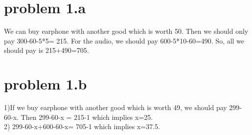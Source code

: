 \documentclass[12pt]{iopart}
\begin{document}
	\newcommand{\mL}{\mathscr{L}}
	\newcommand{\cT}{{\cal T}}
	\newcommand{\cM}{{\cal M}}
	\newcommand{\cE}{{\cal E}}
	\newcommand{\cL}{{\cal L}}
	\newcommand{\cF}{{\cal F}}
	\newcommand{\cB}{{\cal B}}
	\newcommand{\PML}{{\rm PML}}
	\newcommand{\FEM}{{\rm FEM}}
	\newcommand{\rd}{\,\mathrm{d}}
	
	\renewcommand{\i}{\mathbf{i}}
	\renewcommand{\v}{\mathbf{v}}
	\renewcommand{\u}{\mathbf{u}}

	\newcommand{\U}{\mathbf{U}}
	\newcommand{\w}{\mathbf{w}}
	\newcommand{\q}{\mathbf{q}}
	\newcommand{\W}{\mathbf{W}}
	\newcommand{\Q}{\mathbf{Q}}



\newcommand{\A}{{\mathbb{A}}}
	\renewcommand{\r}{\mathbf{r}}
	\newcommand{\R}{{\mathbb{R}}}
	\newcommand{\Z}{{\mathbb{Z}}}
	\newcommand{\C}{{\mathbb{C}}}
	\newcommand{\I}{{\mathbb{I}}}
	\renewcommand{\Re}{\mathrm{Re}\,}
	\renewcommand{\Im}{\mathrm{Im}\,}
	\renewcommand{\div}{\mathrm{div}}
	\newcommand{\curl}{\mathrm{curl}}
	\newcommand{\Curl}{\mathbf{curl}}
	
	\newcommand{\Np}{\mathcal{N}_p}
	\newcommand{\Ns}{\mathcal{N}_s}
	\newcommand{\Tp}{\mathcal{T}_p}
	\newcommand{\Ts}{\mathcal{T}_s}
	
	\newcommand{\be}{\begin{eqnarray}}
		\newcommand{\ee}{\end{eqnarray}}
	\newcommand{\ben}{\begin{eqnarray*}}
		\newcommand{\een}{\end{eqnarray*}}
	\newcommand{\nn}{\nonumber}

\section{problem 1.a}



We can buy earphone with another good which is worth 50. Then we should only pay  300-60-5*5= 215. For the audio, we should pay 600-5*10-60=490. So, all we should pay is 215+490=705.

\section{problem 1.b}

1)If we buy earphone with another good which is worth 49, we should pay 299-60-x.
Then 299-60-x = 215-1 which implies x=25.
\\
2) 299-60-x+600-60-x= 705-1 which implies x=37.5.
\end{document}

